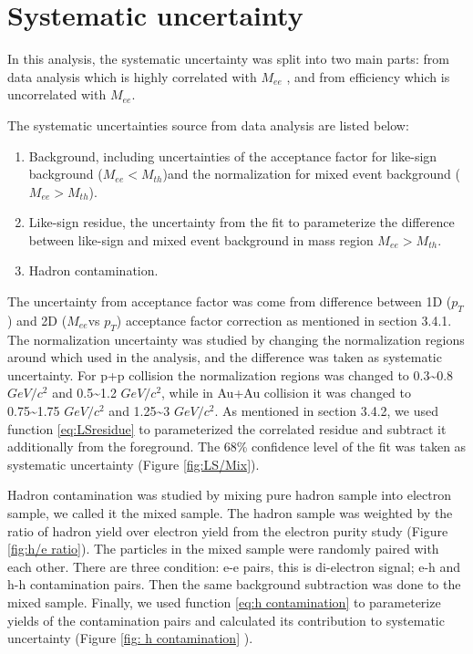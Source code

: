 \section{Systematic uncertainty}

In this analysis, the systematic uncertainty was split into two main
parts: from data analysis which is highly correlated with $M_{ee}$
, and from efficiency which is uncorrelated with $M_{ee}$.

The systematic uncertainties source from data analysis are listed
below:
\begin{enumerate}
\item Background, including uncertainties of the acceptance factor for like-sign
background ($M_{ee}<M_{th}$)and the normalization for mixed event
background ($M_{ee}>M_{th}$).
\item Like-sign residue, the uncertainty from the fit to parameterize the
difference between like-sign and mixed event background in mass region
$M_{ee}>M_{th}$.
\item Hadron contamination.
\end{enumerate}
The uncertainty from acceptance factor was come from difference between
1D ($p_{T}$) and 2D ($M_{ee}$vs $p_{T}$) acceptance factor correction
as mentioned in section 3.4.1. The normalization uncertainty was studied
by changing the normalization regions around which used in the analysis,
and the difference was taken as systematic uncertainty. For p+p collision
the normalization regions was changed to 0.3\textasciitilde{}0.8 $GeV/c^{2}$
and 0.5\textasciitilde{}1.2 $GeV/c^{2}$, while in Au+Au collision
it was changed to 0.75\textasciitilde{}1.75 $GeV/c^{2}$ and 1.25\textasciitilde{}3
$GeV/c^{2}$. As mentioned in section 3.4.2, we used function \ref{eq:LSresidue}
to parameterized the correlated residue and subtract it additionally
from the foreground. The 68\% confidence level of the fit was taken
as systematic uncertainty (Figure \ref{fig:LS/Mix}). 

Hadron contamination was studied by mixing pure hadron sample into
electron sample, we called it the mixed sample. The hadron sample
was weighted by the ratio of hadron yield over electron yield from
the electron purity study (Figure \ref{fig:h/e ratio}). The particles
in the mixed sample were randomly paired with each other. There are
three condition: e-e pairs, this is di-electron signal; e-h and h-h
contamination pairs. Then the same background subtraction was done
to the mixed sample. Finally, we used function \ref{eq:h contamination}
to parameterize yields of the contamination pairs and calculated its
contribution to systematic uncertainty (Figure \ref{fig: h contamination}
).

